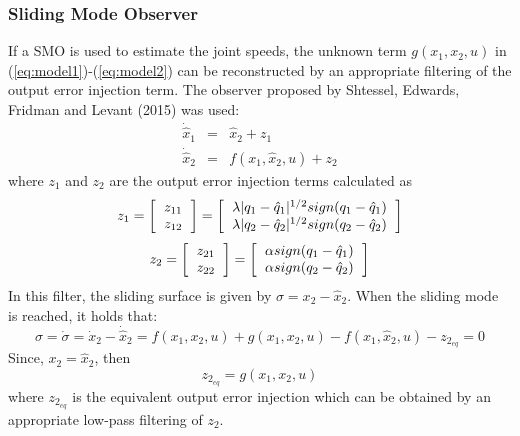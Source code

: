 \documentclass[9pt,spanish,aspectratio=1610]{beamer}
\begin{document}
\begin{frame}\frametitle{Sliding Mode Observer}
  If a SMO is used to estimate the joint speeds, the unknown term $g(x_1, x_2, u)$ in (\ref{eq:model1})-(\ref{eq:model2}) can be reconstructed by an appropriate filtering of the output error injection term. The observer proposed by Shtessel, Edwards, Fridman and Levant (2015) was used:
  \begin{eqnarray}
    \dot{\hat{x}}_1 &=& \hat{x}_2 + z_1\label{eq:observer1}\\
    \dot{\hat{x}}_2 &=& f(x_1, \hat{x}_2, u) + z_2\label{eq:observer2}
  \end{eqnarray}
  where $z_1$ and $z_2$ are the output error injection terms calculated as
  \begin{equation*}z_1 =
    \left[\begin{tabular}{c}
            $z_{11}$\\
            $z_{12}$
    \end{tabular}\right] = 
    \left[\begin{tabular}{c}
      $\lambda\vert q_1 - \hat{q}_1\vert ^{1/2}sign(q_1 - \hat{q}_1)$ \\
      $\lambda\vert q_2 - \hat{q}_2\vert ^{1/2}sign(q_2 - \hat{q}_2)$
    \end{tabular}\right]
\end{equation*}
\begin{equation*}z_2 =
  \left[\begin{tabular}{c}
            $z_{21}$\\
            $z_{22}$
    \end{tabular}\right] = 
  \left[\begin{tabular}{c}
      $\alpha sign(q_1 - \hat{q}_1)$ \\
      $\alpha sign(q_2 - \hat{q}_2)$
    \end{tabular}\right]
\end{equation*}
In this filter, the sliding surface is given by $\sigma = x_2 - \hat{x}_2$. When the sliding mode is reached, it holds that:
\[\sigma = \dot{\sigma} = \dot{x}_2 - \dot{\hat{x}}_2 = f(x_1, x_2, u) + g(x_1, x_2, u) - f(x_1, \hat{x}_2, u) - z_{2_{eq}} = 0\]
Since,  $x_2 = \hat{x}_2$, then
\begin{equation*}
  z_{2_{eq}} = g(x_1, x_2, u)
\end{equation*}
where $z_{2_{eq}}$ is the equivalent output error injection which can be obtained by an appropriate low-pass filtering of $z_2$. 
\end{frame}
\end{document}
